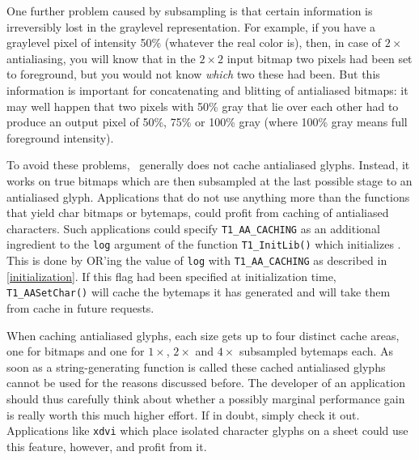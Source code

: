 One further problem caused by subsampling is that certain information is
irreversibly lost in the graylevel representation. For example, if you have a
graylevel pixel of intensity 50\% (whatever the real color is), then, in case
of $2\times$ antialiasing, you will know that in the $2\times 2$ input bitmap
two pixels had been set to foreground, but you would not know {\em which} two
these had been. But this information is important for concatenating and
blitting of antialiased bitmaps: it may well happen that two pixels with 50\%
gray that lie over each other had to produce an output pixel of 50\%, 75\%
or 100\% gray (where 100\% gray means full foreground intensity).

To avoid these problems, \tonelib\ generally does not cache antialiased
glyphs. Instead, it works on true bitmaps which are then subsampled at the
last possible stage to an antialiased glyph. Applications that do not use
anything more than the functions that yield char bitmaps or bytemaps, could
profit from caching of antialiased characters. Such applications could specify
\verb+T1_AA_CACHING+ as an additional ingredient to the \verb+log+ argument of
the function \verb+T1_InitLib()+ which initializes \tonelib. This is done by
OR'ing the value of \verb+log+ with \verb+T1_AA_CACHING+ as described in
\ref{initialization}. If this flag had been specified at initialization time,
\verb+T1_AASetChar()+ will cache the bytemaps it has generated and will take
them from cache in future requests. 

When caching antialiased glyphs, each size gets up to four distinct cache
areas, one for bitmaps and one for $1\times$, $2\times$ and $4\times$ subsampled
bytemaps each. As soon as a string-generating function is called these cached
antialiased glyphs cannot be used for the reasons discussed before. The
developer of an application should thus carefully think about whether 
a possibly marginal performance gain is really worth this much higher
effort. If in doubt, simply check it out. Applications like \verb+xdvi+ which
place isolated character glyphs on a sheet could use this feature, however, and
profit from it.


